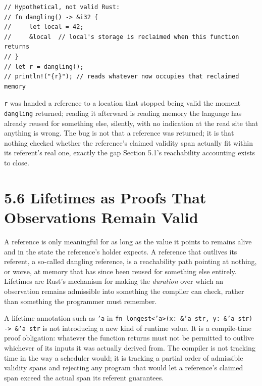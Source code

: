 \documentclass[11pt]{book}
\begin{document}
\begin{lstlisting}
// Hypothetical, not valid Rust:
// fn dangling() -> &i32 {
//     let local = 42;
//     &local  // local's storage is reclaimed when this function returns
// }
// let r = dangling();
// println!("{r}"); // reads whatever now occupies that reclaimed memory
\end{lstlisting}

\texttt{r} was handed a reference to a location that stopped being valid the moment \texttt{dangling} returned; reading it afterward is reading memory the language has already reused for something else, silently, with no indication at the read site that anything is wrong. The bug is not that a reference was returned; it is that nothing checked whether the reference's claimed validity span actually fit within its referent's real one, exactly the gap Section 5.1's reachability accounting exists to close.

\section*{5.6 Lifetimes as Proofs That Observations Remain Valid}

A reference is only meaningful for as long as the value it points to remains alive and in the state the reference's holder expects. A reference that outlives its referent, a so-called dangling reference, is a reachability path pointing at nothing, or worse, at memory that has since been reused for something else entirely. Lifetimes are Rust's mechanism for making the \emph{duration} over which an observation remains admissible into something the compiler can check, rather than something the programmer must remember.

A lifetime annotation such as \texttt{'a} in \texttt{fn longest<'a>(x: \&'a str, y: \&'a str) -> \&'a str} is not introducing a new kind of runtime value. It is a compile-time proof obligation: whatever the function returns must not be permitted to outlive whichever of its inputs it was actually derived from. The compiler is not tracking time in the way a scheduler would; it is tracking a partial order of admissible validity spans and rejecting any program that would let a reference's claimed span exceed the actual span its referent guarantees.
\end{document}
